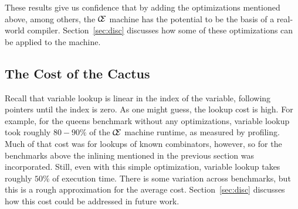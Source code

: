 These results give us confidence that by adding the optimizations mentioned
above, among others, the $\mathcal{\mathcal{C} \mskip -4mu \mathcal{E}}$ machine has the potential to be the
basis of a real-world compiler. Section~\ref{sec:disc} discusses how some of
these optimizations can be applied to the \ce machine.

\subsection{The Cost of the Cactus}

Recall that variable lookup is linear in the index of the variable, following
pointers until the index is zero. As one might guess, the lookup cost is high.
For example, for the queens benchmark without any optimizations, variable lookup
took roughly $80-90\%$ of the $\mathcal{\mathcal{C} \mskip -4mu \mathcal{E}}$ machine runtime, as measured
by profiling. Much of that cost was for lookups of known combinators, however,
so for the benchmarks above the inlining mentioned in the previous section was
incorporated. Still, even with this simple optimization, variable lookup takes
roughly $50\%$ of execution time. There is some variation across benchmarks, but
this is a rough approximation for the average cost. Section~\ref{sec:disc}
discusses how this cost could be addressed in future work.


